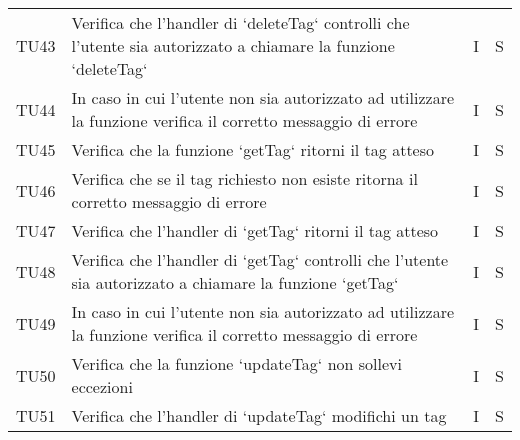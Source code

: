 \begin{center}
\begin{longtable}[!h]{p{45px} p{255px} p{35px} p{35px}}
        TU43          & Verifica che l'handler di `deleteTag` controlli che l'utente sia autorizzato a chiamare la funzione `deleteTag`                                                                                  & I              & S              \\
        TU44          & In caso in cui l'utente non sia autorizzato ad utilizzare la funzione verifica il corretto messaggio di errore                                                                                   & I              & S              \\
        TU45          & Verifica che la funzione `getTag` ritorni il tag atteso                                                                                                                                          & I              & S              \\
        TU46          & Verifica che se il tag richiesto non esiste ritorna il corretto messaggio di errore                                                                                                              & I              & S              \\
        TU47          & Verifica che l'handler di `getTag` ritorni il tag atteso                                                                                                                                         & I              & S              \\
        TU48          & Verifica che l'handler di `getTag` controlli che l'utente sia autorizzato a chiamare la funzione `getTag`                                                                                        & I              & S              \\
        TU49          & In caso in cui l'utente non sia autorizzato ad utilizzare la funzione verifica il corretto messaggio di errore                                                                                   & I              & S              \\
        TU50          & Verifica che la funzione `updateTag` non sollevi eccezioni                                                                                                                                       & I              & S              \\
        TU51          & Verifica che l'handler di `updateTag` modifichi un tag                                                                                                                                           & I              & S              \\

\end{longtable}
\end{center}
